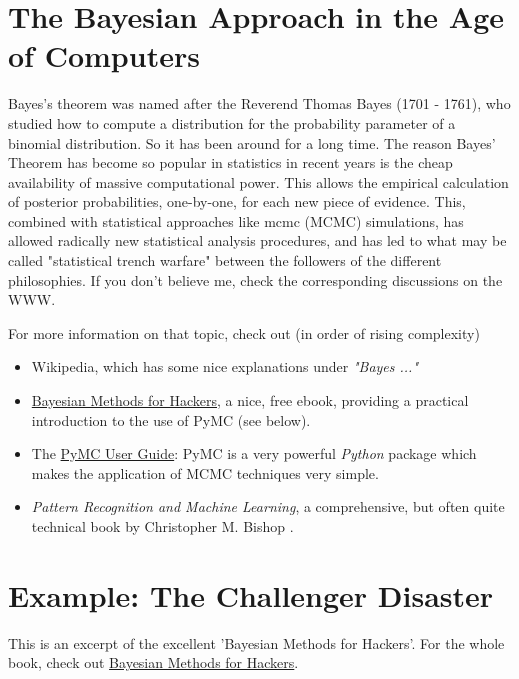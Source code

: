 \section{The Bayesian Approach in the Age of Computers}

Bayes's theorem was named after the Reverend Thomas Bayes (1701 - 1761), who studied how to compute a distribution for the probability parameter of a binomial distribution. So it has been around for a long time. The reason Bayes' Theorem has become so popular in statistics in recent years is the cheap availability of massive computational power. This allows the empirical calculation of posterior probabilities, one-by-one, for each new piece of evidence. This, combined with statistical approaches like \acrfull{mcmc} (MCMC) simulations, has allowed radically new statistical analysis procedures, and has led to what may be called "statistical trench warfare" between the followers of the different philosophies. If you don't believe me, check the corresponding discussions on the WWW.

For more information on that topic, check out (in order of rising complexity)

\begin{itemize}
  \item Wikipedia, which has some nice explanations under \emph{"Bayes ..."}
  \item \href{http://camdavidsonpilon.github.io/Probabilistic-Programming-and-Bayesian-Methods-for-Hackers/}{Bayesian Methods for Hackers}, a nice, free ebook, providing a practical introduction to the use of PyMC (see below).
  \item The \href{http://pymc-devs.github.io/pymc/}{PyMC User Guide}: PyMC is a very powerful \emph{Python} package which makes the application of MCMC techniques very simple.
  \item \emph{Pattern Recognition and Machine Learning}, a comprehensive, but often quite technical book by Christopher M. Bishop \cite{Bishop2007}.
\end{itemize}

\section{Example: The Challenger Disaster}

This is an excerpt of the excellent 'Bayesian Methods for Hackers'. For the whole book, check out \href{http://camdavidsonpilon.github.io/Probabilistic-Programming-and-Bayesian-Methods-for-Hackers/}{Bayesian Methods for Hackers}.


